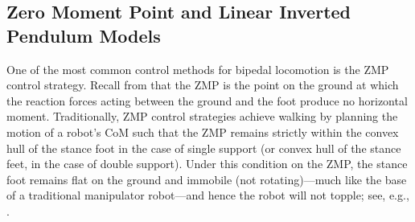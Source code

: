 \subsection{Zero Moment Point and Linear Inverted Pendulum Models}


One of the most common control methods for bipedal locomotion is the ZMP control strategy.
%
Recall from  that the ZMP is the point on the ground at which the reaction forces acting between the ground and the foot produce no horizontal moment.
%
Traditionally, ZMP control strategies achieve walking by planning the motion of a robot's CoM such that the ZMP remains strictly within the convex hull of the stance foot in the case of single support (or convex hull of the stance feet, in the case of double support).
%
Under this condition on the ZMP, the stance foot remains flat on the ground and immobile (not rotating)---much like the base of a traditional manipulator robot---and hence the robot will not topple; see, e.g., \cite{Yamaguchi1999}.

